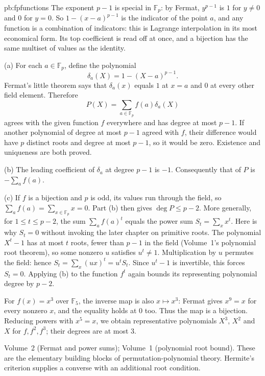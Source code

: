 \begin{solution}{pb:fpfunctions}
\idea The exponent $p-1$ is special in $\mathbb F_p$: by Fermat, $y^{p-1}$ is $1$ for $y\ne0$ and $0$ for $y=0$. So
$1-(x-a)^{p-1}$ is the indicator of the point $a$, and any function is a combination of indicators: this is Lagrange
interpolation in its most economical form. Its top coefficient is read off at once, and a bijection has the same multiset of
values as the identity.

\writeup (a) For each $a\in\mathbb F_p$, define the polynomial
\[
\delta_a(X)=1-(X-a)^{p-1}.
\]
Fermat's little theorem says that $\delta_a(x)$ equals $1$ at $x=a$ and $0$ at every other field element. Therefore
\[
P(X)=\sum_{a\in\mathbb F_p}f(a)\delta_a(X)
\]
agrees with the given function $f$ everywhere and has degree at most $p-1$. If another polynomial of degree at most $p-1$ agreed with $f$, their difference would have $p$ distinct roots and degree at most $p-1$, so it would be zero. Existence and uniqueness are both proved.

(b) The leading coefficient of $\delta_a$ at degree $p-1$ is $-1$. Consequently that of $P$ is $-\sum_af(a)$.

(c) If $f$ is a bijection and $p$ is odd, its values run through the field, so $\sum_af(a)=\sum_{x\in\mathbb F_p}x=0$. Part (b) then gives $\deg P\le p-2$. More generally, for $1\le t\le p-2$, the sum $\sum_af(a)^t$ equals the power sum $S_t=\sum_xx^t$. Here is why $S_t=0$ without invoking the later chapter on primitive roots. The polynomial $X^t-1$ has at most $t$ roots, fewer than $p-1$ in the field (Volume~1's polynomial root theorem), so some nonzero $u$ satisfies $u^t\ne1$. Multiplication by $u$ permutes the field: hence $S_t=\sum_x(ux)^t=u^tS_t$. Since $u^t-1$ is invertible, this forces $S_t=0$. Applying (b) to the function $f^t$ again bounds its representing polynomial degree by $p-2$.

For $f(x)=x^3$ over $\mathbb F_5$, the inverse map is also $x\mapsto x^3$: Fermat gives $x^9=x$ for every nonzero $x$, and the equality holds at $0$ too. Thus the map is a bijection. Reducing powers with $x^5=x$, we obtain representative polynomials $X^3$, $X^2$ and $X$ for $f,f^2,f^3$; their degrees are at most $3$.

\tools Volume~2 (Fermat and power sums); Volume~1 (polynomial root bound).
\leads These are the elementary building blocks of permutation-polynomial theory. Hermite's criterion supplies a converse with an additional root condition.
\end{solution}


